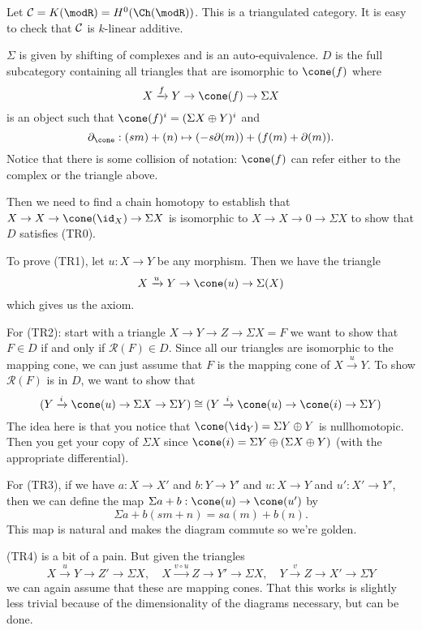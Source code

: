 \documentclass[12pt]{article}
\begin{document}
\begin{ex}
	Let ${\cal C}=K(\modR)=H^0(\Ch(\modR))$. This is a triangulated category. It is easy to check that $\cal C$ is $k$-linear additive.

	$\Sigma$ is given by shifting of complexes and is an auto-equivalence. $D$ is the full subcategory containing all triangles that are
	isomorphic to $\cone(f)$ where 
	\[X\xrightarrow{f} Y\to \cone(f)\to \Sigma X\]
	is an object such that $\cone(f)^i=(\Sigma X\oplus Y)^i$ and 
	\[\partial_{\cone}:(sm)+(n)\mapsto (-s\partial (m))+(f(m)+\partial(m)).\]
	Notice that there is some collision of notation: $\cone(f)$ can refer either to the complex or the triangle above.

	Then we need to find a chain homotopy to establish that $X\to X\to \cone(\id_X)\to\Sigma X$ is isomorphic to $X\to X\to 0\to\Sigma X$ 
	to show that $D$ satisfies (TR0).

	To prove (TR1), let $u:X\to Y$ be any morphism. Then we have the triangle
	\[X\xrightarrow{u} Y\to\cone(u)\to\Sigma(X)\]
	which gives us the axiom.

	For (TR2): start with a triangle $X\to Y\to Z\to \Sigma X=F$ we want to show that $F\in D$ if and only if $\mathcal{R}(F)\in D$.
	Since all our triangles are isomorphic to the mapping cone, we can just assume that $F$ is the mapping cone of $X\xrightarrow{u}Y$.
	To show $\mathcal{R}(F)$ is in $D$, we want to show that 
	\[(Y\xrightarrow{i}\cone(u)\to\Sigma X\to \Sigma Y)\cong (Y\xrightarrow{i}\cone(u)\to\cone(i)\to \Sigma Y)\]
	The idea here is that you notice that $\cone(\id_Y)=\Sigma Y\oplus Y$ is nullhomotopic. Then you get your copy of $\Sigma X$
	since $\cone(i)=\Sigma Y\oplus(\Sigma X\oplus Y)$ (with the appropriate differential).
	
	For (TR3), if we have $a:X\to X'$ and $b:Y\to Y'$ and $u:X\to Y$ and $u':X'\to Y'$, then we can define the 
	map $\Sigma a+b:\cone(u)\to\cone(u')$ by 
	\[\Sigma a+b(sm+n)=sa(m)+b(n).\]
	This map is natural and makes the diagram commute so we're golden.

	(TR4) is a bit of a pain. But given the triangles 
	\[X\xrightarrow{u}Y\to Z'\to \Sigma X,\quad X\xrightarrow{v\circ u}Z\to Y'\to \Sigma X,\quad Y\xrightarrow{v}Z\to X'\to\Sigma Y\]
	we can again assume that these are mapping cones. That this works is slightly less trivial because of the dimensionality of the 
	diagrams necessary, but can be done. 


\end{ex}
\end{document}
